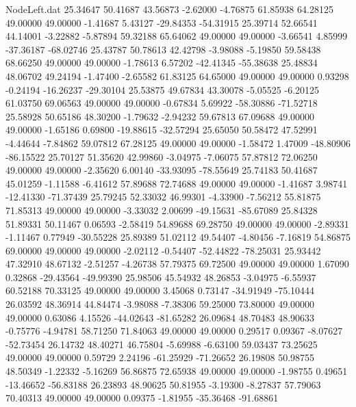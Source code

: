 \begin{filecontents}{NodeLeft.dat}
  25.34647   50.41687   43.56873    -2.62000   -4.76875   61.85938   64.28125   49.00000   49.00000   -1.41687    5.43127  -29.84353  -54.31915
  25.39714   52.66541   44.14001    -3.22882   -5.87894   59.32188   65.64062   49.00000   49.00000   -3.66541    4.85999  -37.36187  -68.02746
  25.43787   50.78613   42.42798    -3.98088   -5.19850   59.58438   68.66250   49.00000   49.00000   -1.78613    6.57202  -42.41345  -55.38638
  25.48834   48.06702   49.24194    -1.47400   -2.65582   61.83125   64.65000   49.00000   49.00000    0.93298   -0.24194  -16.26237  -29.30104
  25.53875   49.67834   43.30078    -5.05525   -6.20125   61.03750   69.06563   49.00000   49.00000   -0.67834    5.69922  -58.30886  -71.52718
  25.58928   50.65186   48.30200    -1.79632   -2.94232   59.67813   67.09688   49.00000   49.00000   -1.65186    0.69800  -19.88615  -32.57294
  25.65050   50.58472   47.52991    -4.44644   -7.84862   59.07812   67.28125   49.00000   49.00000   -1.58472    1.47009  -48.80906  -86.15522
  25.70127   51.35620   42.99860    -3.04975   -7.06075   57.87812   72.06250   49.00000   49.00000   -2.35620    6.00140  -33.93095  -78.55649
  25.74183   50.41687   45.01259    -1.11588   -6.41612   57.89688   72.74688   49.00000   49.00000   -1.41687    3.98741  -12.41330  -71.37439
  25.79245   52.33032   46.99301    -4.33900   -7.56212   55.81875   71.85313   49.00000   49.00000   -3.33032    2.00699  -49.15631  -85.67089
  25.84328   51.89331   50.11467     0.06593   -2.58419   54.89688   69.28750   49.00000   49.00000   -2.89331   -1.11467    0.77949  -30.55228
  25.89389   51.02112   49.54407    -4.80456   -7.16819   54.86875   69.00000   49.00000   49.00000   -2.02112   -0.54407  -52.44822  -78.25031
  25.93442   47.32910   48.67132    -2.51257   -4.26738   57.79375   69.72500   49.00000   49.00000    1.67090    0.32868  -29.43564  -49.99390
  25.98506   45.54932   48.26853    -3.04975   -6.55937   60.52188   70.33125   49.00000   49.00000    3.45068    0.73147  -34.91949  -75.10444
  26.03592   48.36914   44.84474    -3.98088   -7.38306   59.25000   73.80000   49.00000   49.00000    0.63086    4.15526  -44.02643  -81.65282
  26.09684   48.70483   48.90633    -0.75776   -4.94781   58.71250   71.84063   49.00000   49.00000    0.29517    0.09367   -8.07627  -52.73454
  26.14732   48.40271   46.75804    -5.69988   -6.63100   59.03437   73.25625   49.00000   49.00000    0.59729    2.24196  -61.25929  -71.26652
  26.19808   50.98755   48.50349    -1.22332   -5.16269   56.86875   72.65938   49.00000   49.00000   -1.98755    0.49651  -13.46652  -56.83188
  26.23893   48.90625   50.81955    -3.19300   -8.27837   57.79063   70.40313   49.00000   49.00000    0.09375   -1.81955  -35.36468  -91.68861

\end{filecontents}
